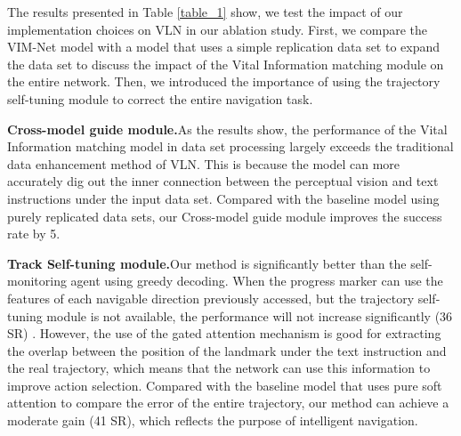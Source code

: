 The results presented in Table \ref{table_1} show, we test the impact of our implementation choices on VLN in our ablation study. First, we compare the VIM-Net model with a model that uses a simple replication data set to expand the data set to discuss the impact of the Vital Information matching module on the entire network. Then, we introduced the importance of using the trajectory self-tuning module to correct the entire navigation task.

\textbf{Cross-model guide module.}As the results show, the performance of the Vital Information matching model in data set processing largely exceeds the traditional data enhancement method of VLN. This is because the model can more accurately dig out the inner connection between the perceptual vision and text instructions under the input data set. Compared with the baseline model using purely replicated data sets, our Cross-model guide module improves the success rate by 5.

\textbf{Track Self-tuning module.}Our method is significantly better than the self-monitoring agent using greedy decoding. When the progress marker can use the features of each navigable direction previously accessed, but the trajectory self-tuning module is not available, the performance will not increase significantly (36 SR) . However, the use of the gated attention mechanism is good for extracting the overlap between the position of the landmark under the text instruction and the real trajectory, which means that the network can use this information to improve action selection. Compared with the baseline model that uses pure soft attention to compare the error of the entire trajectory, our method can achieve a moderate gain (41 SR), which reflects the purpose of intelligent navigation.


